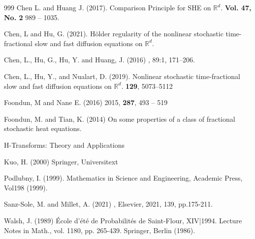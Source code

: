 \documentclass[a4paper,11pt]{article}
\numberwithin{equation}{section}
\theoremstyle{plain}
\theoremstyle{definition}
\newcommand{\R}{\mathbb{R}}
\numberwithin{NQ}{section}
\numberwithin{LQ}{section}
\numberwithin{ZQ}{section}
\begin{document}
	\begin{thebibliography}{999}
		Chen L. and Huang J. (2017).
		\newblock Comparison Principle for SHE on $\R^d$.
		 \textbf{Vol. 47, No. 2} 989 -- 1035.
		
		Chen, L and Hu, G. (2021).
		\newblock H\"older regularity of the nonlinear stochastic time-fractional slow and fast diffusion equations on $\R^d$.
		
		Chen, L., Hu, G., Hu, Y. and Huang, J. (2016)
		, 89:1, 171--206.
		
		Chen, L., Hu, Y., and Nualart, D. (2019).
		\newblock Nonlinear stochastic time-fractional slow and fast diffusion equations on $\R^d$.
		 \textbf{129}, 5073--5112
		
		Foondun, M and Nane E. (2016)
		 2015, \textbf{287}, 493 -- 519
		
		Foondun, M. and Tian, K. (2014)
		\newblock On some properties of a class of fractional stochastic heat equations.
		
		\newblock H-Transforms: Theory and Applications 
		
		Kuo, H. (2000)
		\newblock Springer, Universitext
		
		Podlubny, I. (1999).
		\newblock Mathematics in Science and Engineering, Academic Press, Vol198 (1999).
		
		Sanz-Sole, M. and Millet, A. (2021)
		, Elsevier, 2021, 139, pp.175-211.
		
		Walsh, J. (1989)
		\newblock \'Ecole d'\'et\'e de Probabilit\'es de Saint-Flour, XIV|1994. Lecture Notes in Math., vol. 1180, pp. 265-439. Springer, Berlin (1986).
	\end{thebibliography}
	
\end{document}
